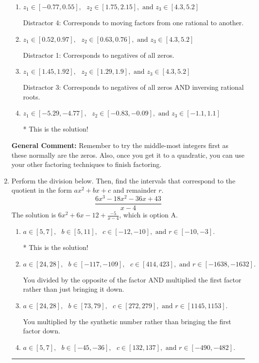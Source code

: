 \documentclass{extbook}[14pt]
\newcommand{\litem}[1]{\item #1

\rule{\textwidth}{0.4pt}}
\begin{document}
\begin{enumerate}
{\begin{enumerate}[label=\Alph*.]
 Distractor 2: Corresponds to inversing rational roots.
\item \( z_1 \in [-0.77, 0.55], \text{   }  z_2 \in [1.75, 2.15], \text{   and   } z_3 \in [4.3, 5.2] \)

 Distractor 4: Corresponds to moving factors from one rational to another.
\item \( z_1 \in [0.52, 0.97], \text{   }  z_2 \in [0.63, 0.76], \text{   and   } z_3 \in [4.3, 5.2] \)

 Distractor 1: Corresponds to negatives of all zeros.
\item \( z_1 \in [1.45, 1.92], \text{   }  z_2 \in [1.29, 1.9], \text{   and   } z_3 \in [4.3, 5.2] \)

 Distractor 3: Corresponds to negatives of all zeros AND inversing rational roots.
\item \( z_1 \in [-5.29, -4.77], \text{   }  z_2 \in [-0.83, -0.09], \text{   and   } z_3 \in [-1.1, 1.1] \)

* This is the solution!
\end{enumerate}

\textbf{General Comment:} Remember to try the middle-most integers first as these normally are the zeros. Also, once you get it to a quadratic, you can use your other factoring techniques to finish factoring.
}
\litem{
Perform the division below. Then, find the intervals that correspond to the quotient in the form $ax^2+bx+c$ and remainder $r$.
\[ \frac{6x^{3} -18 x^{2} -36 x + 43}{x -4} \]The solution is \( 6x^{2} +6 x -12 + \frac{-5}{x -4} \), which is option A.\begin{enumerate}[label=\Alph*.]
\item \( a \in [5, 7], \text{   } b \in [5, 11], \text{   } c \in [-12, -10], \text{   and   } r \in [-10, -3]. \)

* This is the solution!
\item \( a \in [24, 28], \text{   } b \in [-117, -109], \text{   } c \in [414, 423], \text{   and   } r \in [-1638, -1632]. \)

 You divided by the opposite of the factor AND multiplied the first factor rather than just bringing it down.
\item \( a \in [24, 28], \text{   } b \in [73, 79], \text{   } c \in [272, 279], \text{   and   } r \in [1145, 1153]. \)

 You multiplied by the synthetic number rather than bringing the first factor down.
\item \( a \in [5, 7], \text{   } b \in [-45, -36], \text{   } c \in [132, 137], \text{   and   } r \in [-490, -482]. \)


\end{enumerate}}
\end{enumerate}
\end{document}
